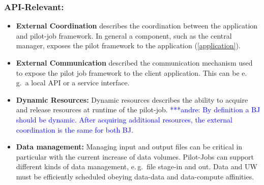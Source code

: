 \documentclass[conference,final]{IEEEtran}
\newcommand{\alnote}[1]{ {\textcolor{blue} { ***andre: #1 }}}
\newcommand{\alnote}[1]{}
\begin{document}
\subsubsection{API-Relevant:}
\begin{itemize}

    \item \textbf{External Coordination} describes the coordination between 
	 the application and pilot-job framework. In general a component, such 
	 as the central manager, exposes the pilot framework to the  application 
	 (\ref{application}). 
	 

	\item \textbf{External Communication} described the communication mechanism 
	used to expose the pilot job framework to the client application.  This can 
	be e.\,g.\ a local API or a service interface.
	
	\item \textbf{Dynamic Resources:} Dynamic resources describes the ability 
	to acquire and release resources at runtime of the pilot-job.
	    \alnote{By definition a BJ should be dynamic. After acquiring additional 
	    resources, the external coordination is the same for both BJ.}

	\item \textbf{Data management:} Managing input and output files can be 
	critical in particular with the current increase of data volumes. Pilot-Jobs 
	can support different kinds of data management, e.\,g.\ file stage-in and 
	out. Data and UW must be efficiently scheduled obeying data-data and 
	data-compute affinities. 


\end{itemize}
\end{document}
